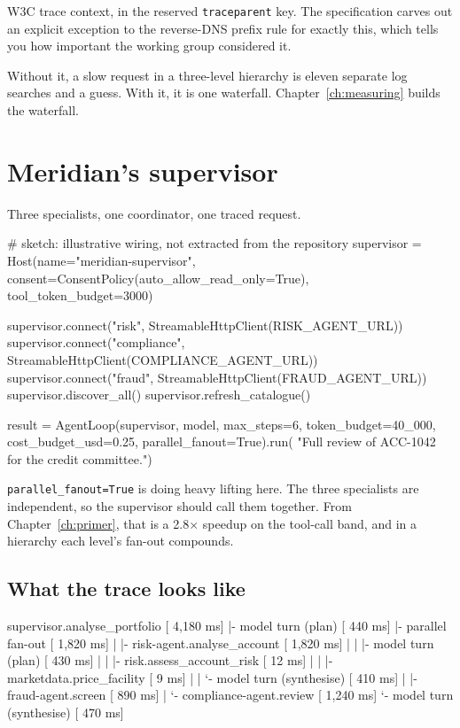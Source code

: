 W3C trace context, in the reserved \texttt{traceparent} key. The specification
carves out an explicit exception to the reverse-DNS prefix rule for exactly this,
which tells you how important the working group considered it.

Without it, a slow request in a three-level hierarchy is eleven separate log
searches and a guess. With it, it is one waterfall. Chapter~\ref{ch:measuring}
builds the waterfall.

\section{Meridian's supervisor}

Three specialists, one coordinator, one traced request.

\begin{py}
# sketch: illustrative wiring, not extracted from the repository
supervisor = Host(name="meridian-supervisor",
                  consent=ConsentPolicy(auto_allow_read_only=True),
                  tool_token_budget=3000)

supervisor.connect("risk",       StreamableHttpClient(RISK_AGENT_URL))
supervisor.connect("compliance", StreamableHttpClient(COMPLIANCE_AGENT_URL))
supervisor.connect("fraud",      StreamableHttpClient(FRAUD_AGENT_URL))
supervisor.discover_all()
supervisor.refresh_catalogue()

result = AgentLoop(supervisor, model,
                   max_steps=6,
                   token_budget=40_000,
                   cost_budget_usd=0.25,
                   parallel_fanout=True).run(
    "Full review of ACC-1042 for the credit committee.")
\end{py}

\texttt{parallel\_fanout=True} is doing heavy lifting here. The three specialists
are independent, so the supervisor should call them together. From
Chapter~\ref{ch:primer}, that is a 2.8$\times$ speedup on the tool-call band, and
in a hierarchy each level's fan-out compounds.

\subsection{What the trace looks like}

\begin{plain}
supervisor.analyse_portfolio                        [ 4,180 ms]
 |- model turn (plan)                               [   440 ms]
 |- parallel fan-out                                [ 1,820 ms]
 |   |- risk-agent.analyse_account                  [ 1,820 ms]
 |   |   |- model turn (plan)                       [   430 ms]
 |   |   |- risk.assess_account_risk                [    12 ms]
 |   |   |- marketdata.price_facility               [     9 ms]
 |   |   `- model turn (synthesise)                 [   410 ms]
 |   |- fraud-agent.screen                          [   890 ms]
 |   `- compliance-agent.review                     [ 1,240 ms]
 `- model turn (synthesise)                         [   470 ms]
\end{plain}


